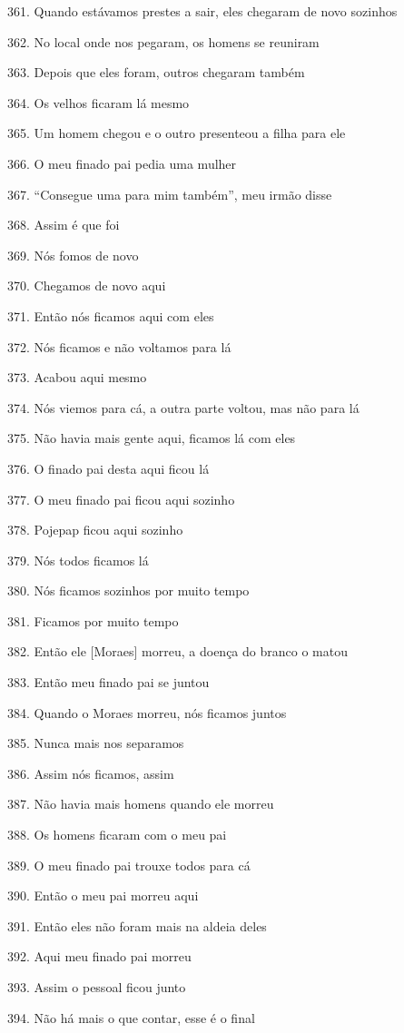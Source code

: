 361. Quando estávamos prestes a sair, eles chegaram de novo sozinhos

362. No local onde nos pegaram, os homens se reuniram

363. Depois que eles foram, outros chegaram também

364. Os velhos ficaram lá mesmo

365. Um homem chegou e o outro presenteou a filha para ele

366. O meu finado pai pedia uma mulher

367. ``Consegue uma para mim também'', meu irmão disse

368. Assim é que foi

369. Nós fomos de novo

370. Chegamos de novo aqui

371. Então nós ficamos aqui com eles

372. Nós ficamos e não voltamos para lá

373. Acabou aqui mesmo

374. Nós viemos para cá, a outra parte voltou, mas não para lá

375. Não havia mais gente aqui, ficamos lá com eles

376. O finado pai desta aqui ficou lá

377. O meu finado pai ficou aqui sozinho

378. Pojepap ficou aqui sozinho

379. Nós todos ficamos lá

380. Nós ficamos sozinhos por muito tempo

381. Ficamos por muito tempo

382. Então ele {[}Moraes{]} morreu, a doença do branco o matou

383. Então meu finado pai se juntou

384. Quando o Moraes morreu, nós ficamos juntos

385. Nunca mais nos separamos

386. Assim nós ficamos, assim

387. Não havia mais homens quando ele morreu

388. Os homens ficaram com o meu pai

389. O meu finado pai trouxe todos para cá

390. Então o meu pai morreu aqui

391. Então eles não foram mais na aldeia deles

392. Aqui meu finado pai morreu

393. Assim o pessoal ficou junto

394. Não há mais o que contar, esse é o final